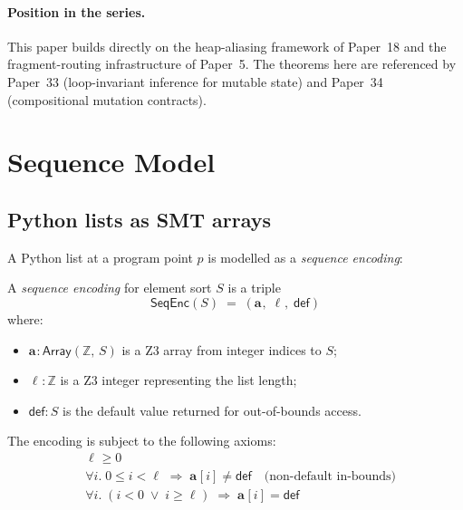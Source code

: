 \documentclass[11pt]{article}
\newcommand{\SeqEnc}[1]{\mathsf{SeqEnc}(#1)}
\newcommand{\arrvar}[1]{\mathbf{a}_{#1}}
\newcommand{\lenvar}[1]{\ell_{#1}}
\newcommand{\defval}{\mathsf{def}}
\newcommand{\idx}{i}
\newcommand{\SeqSort}[1]{\mathsf{Array}(\mathbb{Z},\,#1)}
\begin{document}
\paragraph{Position in the series.}
This paper builds directly on the heap-aliasing framework of Paper~18 and the
fragment-routing infrastructure of Paper~5.  The theorems here are referenced
by Paper~33 (loop-invariant inference for mutable state) and Paper~34
(compositional mutation contracts).

\section{Sequence Model}\label{sec:seqmodel}

\subsection{Python lists as SMT arrays}

A Python list at a program point $p$ is modelled as a \emph{sequence
encoding}:

\begin{definition}\label{def:seqenc}
A \emph{sequence encoding} for element sort $S$ is a triple
\[
  \SeqEnc{S} \;=\; (\arrvar{},\;\lenvar{},\;\defval)
\]
where:
\begin{itemize}[nosep]
  \item $\arrvar{} : \SeqSort{S}$ is a Z3 array from integer indices to $S$;
  \item $\lenvar{} : \mathbb{Z}$ is a Z3 integer representing the list length;
  \item $\defval : S$ is the default value returned for out-of-bounds access.
\end{itemize}
The encoding is subject to the following axioms:
\begin{align}
  &\lenvar{} \geq 0 \tag{A1}\label{ax:non-neg-len}\\
  &\forall \idx.\; 0 \leq \idx < \lenvar{} \;\Rightarrow\; \arrvar{}[\idx] \neq \defval
    \quad\text{(non-default in-bounds)} \tag{A2}\label{ax:inbounds}\\
  &\forall \idx.\; (\idx < 0 \;\vee\; \idx \geq \lenvar{}) \;\Rightarrow\; \arrvar{}[\idx] = \defval
    \tag{A3}\label{ax:oob}
\end{align}
\end{definition}
\end{document}
